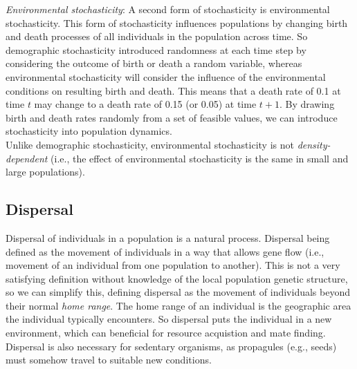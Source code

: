 \documentclass[12pt]{article}
\begin{document}
\bigskip

\textit{Environmental stochasticity}: 
A second form of stochasticity is environmental stochasticity. This form of stochasticity influences populations by changing birth and death processes of all individuals in the population across time. So demographic stochasticity introduced randomness at each time step by considering the outcome of birth or death a random variable, whereas environmental stochasticity will consider the influence of the environmental conditions on resulting birth and death. This means that a death rate of 0.1 at time $t$ may change to a death rate of 0.15 (or 0.05) at time $t+1$. By drawing birth and death rates randomly from a set of feasible values, we can introduce stochasticity into population dynamics. \\


Unlike demographic stochasticity, environmental stochasticity is not \textit{density-dependent} (i.e., the effect of environmental stochasticity is the same in small and large populations). 





















\clearpage

\subsection*{Dispersal}

Dispersal of individuals in a population is a natural process. Dispersal being defined as the movement of individuals in a way that allows gene flow (i.e., movement of an individual from one population to another). This is not a very satisfying definition without knowledge of the local population genetic structure, so we can simplify this, defining dispersal as the movement of individuals beyond their normal \textit{home range}. The home range of an individual is the geographic area the individual typically encounters. So dispersal puts the individual in a new environment, which can beneficial for resource acquistion and mate finding. Dispersal is also necessary for sedentary organisms, as propagules (e.g., seeds) must somehow travel to suitable new conditions. \\
\end{document}

